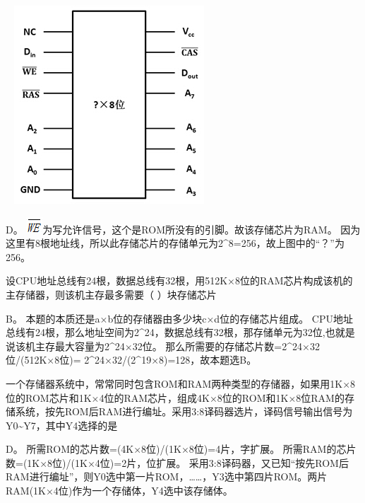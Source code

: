 ~
\includegraphics[width=2.80208in,height=2.91667in]{computerassets/169329cf2d8e984977db0414ac033cd3.jpeg}
\par{}
\begin{solution}D。
\includegraphics[width=0.23958in,height=0.23958in]{computerassets/b350bfb1f8737a0025f7d2cebbbeacc0.jpeg}为写允许信号，这个是ROM所没有的引脚。故该存储芯片为RAM。
因为这里有8根地址线，所以此存储芯片的存储单元为2\^{}8=256，故上图中的``？''为256。
\end{solution}
\question 设CPU地址总线有24根，数据总线有32根，用512K×8位的RAM芯片构成该机的主存储器，则该机主存最多需要（
）块存储芯片
\par{}
\begin{solution}B。 本题的本质还是a×b位的存储器由多少块c×d位的存储芯片组成。
CPU地址总线有24根，那么地址空间为2\^{}24，数据总线有32根，那存储单元为32位,也就是说该机主存最大容量为2\^{}24×32位。
那么所需要的存储芯片数=2\^{}24×32位/(512K×8位)=
2\^{}24×32/(2\^{}19×8)=128，故本题选B。
\end{solution}
\question 一个存储器系统中，常常同时包含ROM和RAM两种类型的存储器，如果用1K×8位的ROM芯片和1K×4位的RAM芯片，组成4K×8位的ROM和1K×8位RAM的存储系统，按先ROM后RAM进行编址。采用3:8译码器选片，译码信号输出信号为Y0\textasciitilde{}Y7，其中Y4选择的是
\par{}
\begin{solution}D。 所需ROM的芯片数=(4K×8位)/(1K×8位)=4片，字扩展。
所需RAM的芯片数=(1K×8位)/(1K×4位)=2片，位扩展。
采用3:8译码器，又已知``按先ROM后RAM进行编址''，则Y0选中第一片ROM，\ldots{}\ldots{}，Y3选中第四片ROM。两片RAM(1K×4位)作为一个存储体，Y4选中该存储体。
\end{solution}
